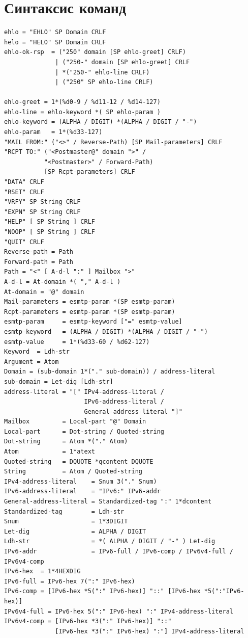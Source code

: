 \documentclass[a4paper,12pt]{report}
\begin{document}
	 \section{Синтаксис команд}\label{section:smtp_syntax}
	 \begin{verbatim}
ehlo = "EHLO" SP Domain CRLF
helo = "HELO" SP Domain CRLF
ehlo-ok-rsp  = ("250" domain [SP ehlo-greet] CRLF)
              | ("250-" domain [SP ehlo-greet] CRLF
              | *("250-" ehlo-line CRLF)
              | ("250" SP ehlo-line CRLF)

ehlo-greet = 1*(%d0-9 / %d11-12 / %d14-127)
ehlo-line = ehlo-keyword *( SP ehlo-param )
ehlo-keyword = (ALPHA / DIGIT) *(ALPHA / DIGIT / "-")
ehlo-param   = 1*(%d33-127)
"MAIL FROM:" ("<>" / Reverse-Path) [SP Mail-parameters] CRLF
"RCPT TO:" ("<Postmaster@" domain ">" /
           "<Postmaster>" / Forward-Path) 
           [SP Rcpt-parameters] CRLF
"DATA" CRLF
"RSET" CRLF
"VRFY" SP String CRLF
"EXPN" SP String CRLF
"HELP" [ SP String ] CRLF
"NOOP" [ SP String ] CRLF
"QUIT" CRLF
Reverse-path = Path
Forward-path = Path
Path = "<" [ A-d-l ":" ] Mailbox ">"
A-d-l = At-domain *( "," A-d-l )
At-domain = "@" domain
Mail-parameters = esmtp-param *(SP esmtp-param)
Rcpt-parameters = esmtp-param *(SP esmtp-param)
esmtp-param     = esmtp-keyword ["=" esmtp-value]
esmtp-keyword   = (ALPHA / DIGIT) *(ALPHA / DIGIT / "-")
esmtp-value     = 1*(%d33-60 / %d62-127)
Keyword  = Ldh-str
Argument = Atom
Domain = (sub-domain 1*("." sub-domain)) / address-literal
sub-domain = Let-dig [Ldh-str]
address-literal = "[" IPv4-address-literal / 
                      IPv6-address-literal /
                      General-address-literal "]"
Mailbox         = Local-part "@" Domain
Local-part      = Dot-string / Quoted-string
Dot-string      = Atom *("." Atom)
Atom            = 1*atext
Quoted-string   = DQUOTE *qcontent DQUOTE
String          = Atom / Quoted-string
IPv4-address-literal    = Snum 3("." Snum)
IPv6-address-literal    = "IPv6:" IPv6-addr
General-address-literal = Standardized-tag ":" 1*dcontent
Standardized-tag        = Ldh-str
Snum                    = 1*3DIGIT
Let-dig                 = ALPHA / DIGIT
Ldh-str                 = *( ALPHA / DIGIT / "-" ) Let-dig
IPv6-addr               = IPv6-full / IPv6-comp / IPv6v4-full / IPv6v4-comp
IPv6-hex  = 1*4HEXDIG
IPv6-full = IPv6-hex 7(":" IPv6-hex)
IPv6-comp = [IPv6-hex *5(":" IPv6-hex)] "::" [IPv6-hex *5(":"IPv6-hex)]
IPv6v4-full = IPv6-hex 5(":" IPv6-hex) ":" IPv4-address-literal
IPv6v4-comp = [IPv6-hex *3(":" IPv6-hex)] "::"
              [IPv6-hex *3(":" IPv6-hex) ":"] IPv4-address-literal
	 \end{verbatim}
\end{document}
